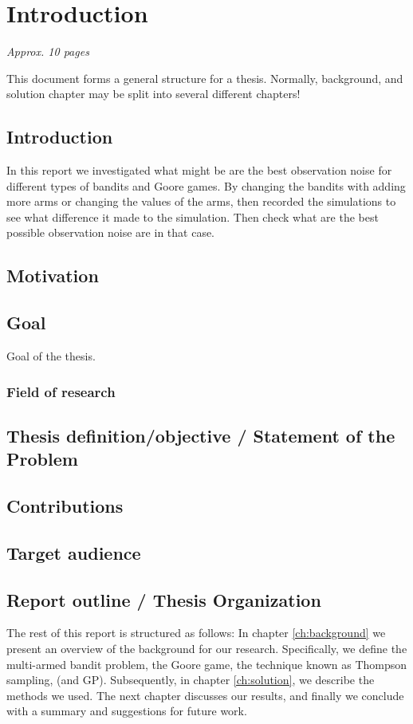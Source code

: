 \chapter{Introduction}
\label{ch:introduction}

\textit{Approx. 10 pages}

This document forms a general structure for a thesis. Normally, background, and
solution chapter may be split into several different chapters!

\section{Introduction}

In this report we investigated what might be are the best observation noise for
different types of bandits and Goore games. By changing the bandits with adding
more arms or changing the values of the arms, then recorded the simulations to
see what difference it made to the simulation. Then check what are the best
possible observation noise are in that case.

\section{Motivation}

\section{Goal}
Goal of the thesis.

\subsection{Field of research}

\section{Thesis definition/objective / Statement of the Problem}

\section{Contributions}
 
\section{Target audience}


\section{Report outline / Thesis Organization}

The rest of this report is structured as follows: In chapter
\ref{ch:background} we present an overview of the background for our research.
Specifically, we define the multi-armed bandit problem, the Goore game, the
technique known as Thompson sampling, (and GP). Subsequently, in chapter
\ref{ch:solution}, we describe the methods we used. The next chapter discusses
our results, and finally we conclude with a summary and suggestions for future
work.
